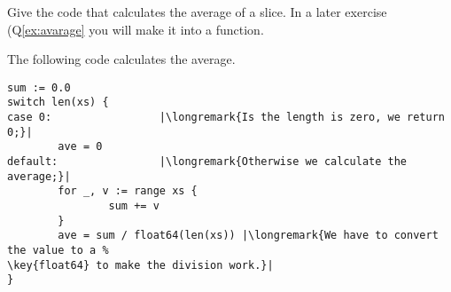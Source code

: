 \begin{Exercise}[title={Average},difficulty=4]
\label{ex:average no func}
\Question\label{ex:average no func q1} Give the code
that calculates the average of a  slice. In
a later exercise (Q\ref{ex:avarage} you will make it into
a function.
\end{Exercise}

\begin{Answer}
\Question The following code calculates the average.
\begin{lstlisting}
sum := 0.0 
switch len(xs) {
case 0:                 |\longremark{Is the length is zero, we return 0;}|
        ave = 0
default:                |\longremark{Otherwise we calculate the average;}|
        for _, v := range xs {
                sum += v
        }
        ave = sum / float64(len(xs)) |\longremark{We have to convert the value to a %
\key{float64} to make the division work.}|
}
\end{lstlisting}
\showremarks
\end{Answer}
